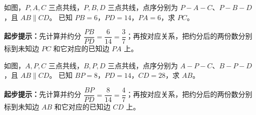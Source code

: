 \documentclass{exam-zh}
\begin{document}

\begin{problem}[points=10]
  \noindent
  \begin{minipage}[t]{\dimexpr\linewidth-60mm-6mm\relax}
    \vspace{0pt}
    如图，$P,A,C$ 三点共线，$P,B,D$ 三点共线，点序分别为 $P-A-C$、$P-B-D$，且 $AB\parallel CD$。
已知 $PB=6$，$PD=14$，$PA=6$，求 $PC$。
    \begin{hintbox}
\textbf{起步提示：}先计算并约分 $\dfrac{PB}{PD}=\dfrac{6}{14}=\dfrac{3}{7}$；再按对应关系，把约分后的两份数分别标到未知边 $PC$ 和它对应的已知边 $PA$ 上。\end{hintbox}

  \end{minipage}\hfill
  \begin{diagramcoltikz}{60mm}{先看平行边方向，再判断 A 字型或 8 字型及对应边。}
  }
  \end{diagramcoltikz}
  \par\medskip
  \answerarea[42mm]
\end{problem}



\begin{problem}[points=10]
  \noindent
  \begin{minipage}[t]{\dimexpr\linewidth-60mm-6mm\relax}
    \vspace{0pt}
    如图，$A,P,C$ 三点共线，$B,P,D$ 三点共线，点序分别为 $A-P-C$、$B-P-D$，且 $AB\parallel CD$。
已知 $BP=8$，$PD=14$，$CD=28$，求 $AB$。
    \begin{hintbox}
\textbf{起步提示：}先计算并约分 $\dfrac{BP}{PD}=\dfrac{8}{14}=\dfrac{4}{7}$；再按对应关系，把约分后的两份数分别标到未知边 $AB$ 和它对应的已知边 $CD$ 上。\end{hintbox}

  \end{minipage}\hfill
  \begin{diagramcoltikz}{60mm}{先看平行边方向，再判断 A 字型或 8 字型及对应边。}
  }
  \end{diagramcoltikz}
  \par\medskip
  \answerarea[42mm]
\end{problem}
\end{document}
